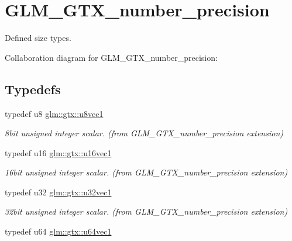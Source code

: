 \hypertarget{group__gtx__number__precision}{\section{G\-L\-M\-\_\-\-G\-T\-X\-\_\-number\-\_\-precision}
\label{group__gtx__number__precision}
}


Defined size types.  


Collaboration diagram for G\-L\-M\-\_\-\-G\-T\-X\-\_\-number\-\_\-precision\-:
\subsection*{Typedefs}
\begin{DoxyCompactItemize}
\item 
\hypertarget{group__gtx__number__precision_ga35ae7849593a354420e4f52d1b36c2d6}{typedef u8 \hyperlink{group__gtx__number__precision_ga35ae7849593a354420e4f52d1b36c2d6}{glm\-::gtx\-::u8vec1}}\label{group__gtx__number__precision_ga35ae7849593a354420e4f52d1b36c2d6}

\begin{DoxyCompactList}\small\item\em 8bit unsigned integer scalar. (from G\-L\-M\-\_\-\-G\-T\-X\-\_\-number\-\_\-precision extension) \end{DoxyCompactList}\item 
\hypertarget{group__gtx__number__precision_ga807d7e5f24e981b1575bd40ca159781d}{typedef u16 \hyperlink{group__gtx__number__precision_ga807d7e5f24e981b1575bd40ca159781d}{glm\-::gtx\-::u16vec1}}\label{group__gtx__number__precision_ga807d7e5f24e981b1575bd40ca159781d}

\begin{DoxyCompactList}\small\item\em 16bit unsigned integer scalar. (from G\-L\-M\-\_\-\-G\-T\-X\-\_\-number\-\_\-precision extension) \end{DoxyCompactList}\item 
\hypertarget{group__gtx__number__precision_gac46a7890b20928df83e734c3ea9557d4}{typedef u32 \hyperlink{group__gtx__number__precision_gac46a7890b20928df83e734c3ea9557d4}{glm\-::gtx\-::u32vec1}}\label{group__gtx__number__precision_gac46a7890b20928df83e734c3ea9557d4}

\begin{DoxyCompactList}\small\item\em 32bit unsigned integer scalar. (from G\-L\-M\-\_\-\-G\-T\-X\-\_\-number\-\_\-precision extension) \end{DoxyCompactList}\item 
\hypertarget{group__gtx__number__precision_ga92812a1d7e746bcaba61d2f5a64afc52}{typedef u64 \hyperlink{group__gtx__number__precision_ga92812a1d7e746bcaba61d2f5a64afc52}{glm\-::gtx\-::u64vec1}}\label{group__gtx__number__precision_ga92812a1d7e746bcaba61d2f5a64afc52}


\end{DoxyCompactItemize}
